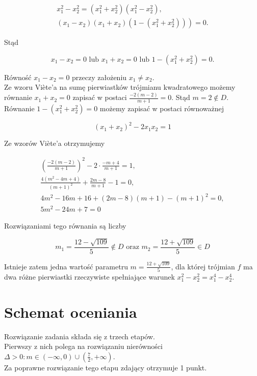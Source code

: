 \documentclass[10pt]{article}
\begin{document}
$$
\begin{gathered}
x_{1}^{2}-x_{2}^{2}=\left(x_{1}^{2}+x_{2}^{2}\right)\left(x_{1}^{2}-x_{2}^{2}\right), \\
\left.\left(x_{1}-x_{2}\right)\left(x_{1}+x_{2}\right)\left(1-\left(x_{1}^{2}+x_{2}^{2}\right)\right)\right)=0 .
\end{gathered}
$$

Stąd

$$
x_{1}-x_{2}=0 \text { lub } x_{1}+x_{2}=0 \text { lub } 1-\left(x_{1}^{2}+x_{2}^{2}\right)=0 .
$$

Równość $x_{1}-x_{2}=0$ przeczy założeniu $x_{1} \neq x_{2}$.\\
Ze wzoru Viète'a na sumę pierwiastków trójmianu kwadratowego możemy równanie $x_{1}+x_{2}=0$ zapisać w postaci $\frac{-2(m-2)}{m+1}=0$. Stąd $m=2 \notin D$.\\
Równanie $1-\left(x_{1}^{2}+x_{2}^{2}\right)=0$ możemy zapisać w postaci równoważnej

$$
\left(x_{1}+x_{2}\right)^{2}-2 x_{1} x_{2}=1
$$

Ze wzorów Viète'a otrzymujemy

$$
\begin{gathered}
\left(\frac{-2(m-2)}{m+1}\right)^{2}-2 \cdot \frac{-m+4}{m+1}=1, \\
\frac{4\left(m^{2}-4 m+4\right)}{(m+1)^{2}}+\frac{2 m-8}{m+1}-1=0, \\
4 m^{2}-16 m+16+(2 m-8)(m+1)-(m+1)^{2}=0, \\
5 m^{2}-24 m+7=0
\end{gathered}
$$

Rozwiązaniami tego równania są liczby

$$
m_{1}=\frac{12-\sqrt{109}}{5} \notin D \text { oraz } m_{2}=\frac{12+\sqrt{109}}{5} \in D
$$

Istnieje zatem jedna wartość parametru $m=\frac{12+\sqrt{109}}{5}$, dla której trójmian $f$ ma dwa różne pierwiastki rzeczywiste spełniające warunek $x_{1}^{2}-x_{2}^{2}=x_{1}^{4}-x_{2}^{4}$.

\section*{Schemat oceniania}
Rozwiązanie zadania składa się z trzech etapów.\\
Pierwszy z nich polega na rozwiązaniu nierówności $\Delta>0: m \in(-\infty, 0) \cup\left(\frac{7}{2},+\infty\right)$.\\
Za poprawne rozwiązanie tego etapu zdający otrzymuje 1 punkt.
\end{document}
